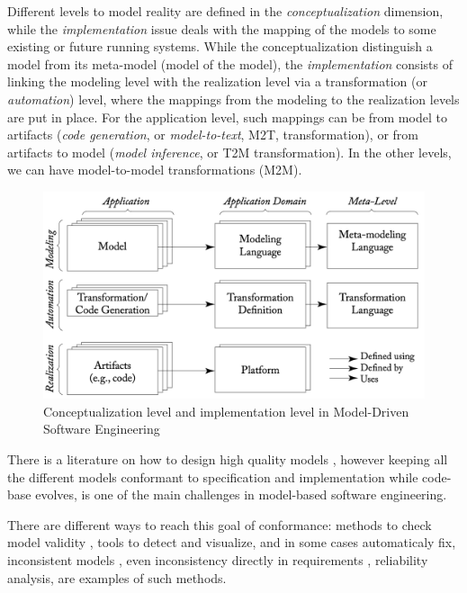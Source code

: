 Different levels to model reality are defined in the \textit{conceptualization} dimension, 
while the \textit{implementation} issue deals with the mapping of the models to some existing or future running systems. 
While the conceptualization distinguish a model from its meta-model (model of the model), the \textit{implementation} consists of linking the modeling level with the realization level via a transformation (or \textit{automation}) level, where the mappings from the modeling to the realization levels are put in place.
For the application level, such mappings can be from model to artifacts (\textit{code generation}, or \textit{model-to-text}, M2T, transformation), or from artifacts to model (\textit{model inference}, or T2M transformation). In the other levels, we can have model-to-model transformations (M2M).

\begin{figure}[!htb]
	\centering
	\includegraphics[width=.8\columnwidth]{mdse.png}
	\caption{Conceptualization level and implementation level in Model-Driven Software Engineering}
	\label{fig:mdse}
\end{figure}

There is a literature on how to design high quality models \cite{Krogstie:2012:MDE:2331118}, however keeping all the different models conformant to specification and implementation while code-base evolves, is one of the main challenges in model-based software engineering.

There are different ways to reach this goal of conformance: methods to check model validity \cite{parizek2006model,arcaini2018modelling}, tools to detect and visualize, and in some cases automaticaly fix, inconsistent models \cite{egyed_scenario-driven_2003,egyed_fixing_2007,egyed_scalable_2001}, even inconsistency directly in requirements \cite{egyed_identifying_2004,egyed_automating_2002}, reliability analysis, are examples of such methods.

